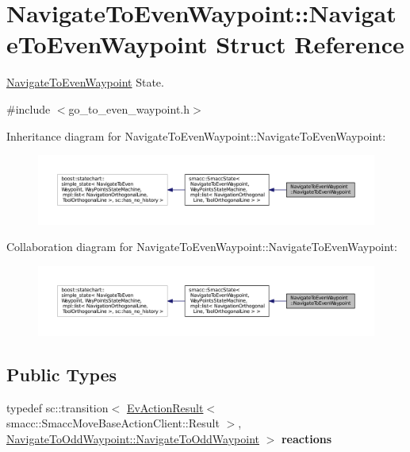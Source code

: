 \hypertarget{structNavigateToEvenWaypoint_1_1NavigateToEvenWaypoint}{}\section{Navigate\+To\+Even\+Waypoint\+:\+:Navigate\+To\+Even\+Waypoint Struct Reference}
\label{structNavigateToEvenWaypoint_1_1NavigateToEvenWaypoint}


\hyperlink{structNavigateToEvenWaypoint_1_1NavigateToEvenWaypoint}{Navigate\+To\+Even\+Waypoint} State.  




{\ttfamily \#include $<$go\+\_\+to\+\_\+even\+\_\+waypoint.\+h$>$}



Inheritance diagram for Navigate\+To\+Even\+Waypoint\+:\+:Navigate\+To\+Even\+Waypoint\+:
\nopagebreak
\begin{figure}[H]
\begin{center}
\leavevmode
\includegraphics[width=350pt]{structNavigateToEvenWaypoint_1_1NavigateToEvenWaypoint__inherit__graph}
\end{center}
\end{figure}


Collaboration diagram for Navigate\+To\+Even\+Waypoint\+:\+:Navigate\+To\+Even\+Waypoint\+:
\nopagebreak
\begin{figure}[H]
\begin{center}
\leavevmode
\includegraphics[width=350pt]{structNavigateToEvenWaypoint_1_1NavigateToEvenWaypoint__coll__graph}
\end{center}
\end{figure}
\subsection*{Public Types}
\begin{DoxyCompactItemize}
\item 
typedef sc\+::transition$<$ \hyperlink{structsmacc_1_1EvActionResult}{Ev\+Action\+Result}$<$ smacc\+::\+Smacc\+Move\+Base\+Action\+Client\+::\+Result $>$, \hyperlink{structNavigateToOddWaypoint_1_1NavigateToOddWaypoint}{Navigate\+To\+Odd\+Waypoint\+::\+Navigate\+To\+Odd\+Waypoint} $>$ {\bfseries reactions}\hypertarget{structNavigateToEvenWaypoint_1_1NavigateToEvenWaypoint_a679bd0d719bf338ba0adbb7516aa7031}{}\label{structNavigateToEvenWaypoint_1_1NavigateToEvenWaypoint_a679bd0d719bf338ba0adbb7516aa7031}

\end{DoxyCompactItemize}
